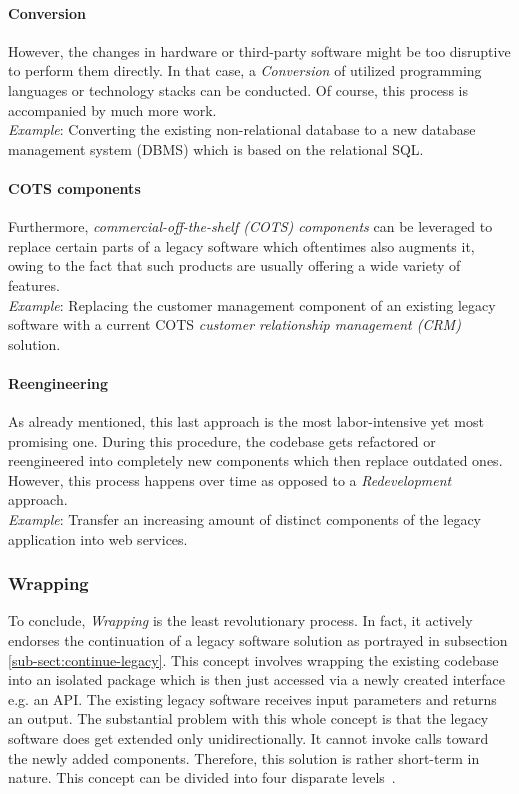 \documentclass[12pt,a4paper,twoside]{report}
\begin{document}
\paragraph{Conversion}
However, the changes in hardware or third-party software might be too disruptive
to perform them directly. In that case, a \textit{Conversion} of utilized
programming languages or technology stacks can be conducted.
Of course, this process is accompanied by much more work.\\
\textit{Example}: Converting the existing non-relational database to a
new database management system (DBMS) which is based on the relational SQL.

\paragraph{COTS components}
Furthermore, \textit{commercial-off-the-shelf (COTS) components} can be
leveraged to replace certain parts of a legacy software which oftentimes also
augments it, owing to the fact that such products are usually offering a wide
variety of features.\\
\textit{Example}: Replacing the customer management component of an existing
legacy software with a current COTS \textit{customer relationship management (CRM)} solution.

\paragraph{Reengineering}
As already mentioned, this last approach is the most labor-intensive yet most promising one.
During this procedure, the codebase gets refactored or reengineered
into completely new components which then replace outdated ones.
However, this process happens over time as opposed to a \textit{Redevelopment} approach.\\
\textit{Example}: Transfer an increasing amount of distinct components
of the legacy application into web services.


\subsubsection{Wrapping}

To conclude, \textit{Wrapping} is the least revolutionary process.
In fact, it actively endorses the continuation of a legacy software solution as
portrayed in subsection \ref{sub-sect:continue-legacy}.
This concept involves wrapping the existing codebase into an isolated package
which is then just accessed via a newly created interface e.g. an API.
The existing legacy software receives input parameters and returns an output.
The substantial problem with this whole concept is that the legacy software does get
extended only unidirectionally. It cannot invoke calls toward the newly added components.
Therefore, this solution is rather short-term in nature.
This concept can be divided into four disparate levels~\cite{sneed-encapsulating-legacy}.
\end{document}
